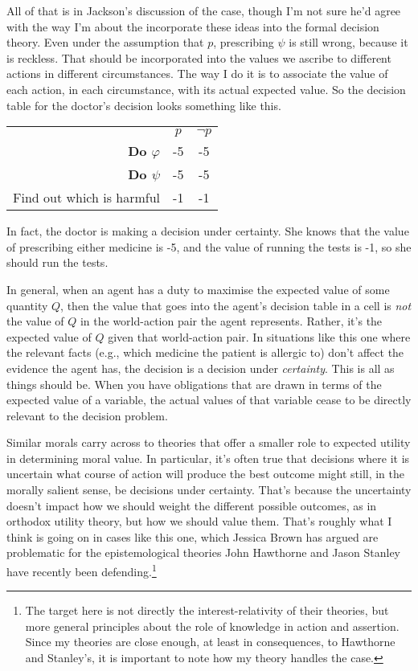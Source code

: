 \documentclass[11pt,oneside]{book}
\begin{document}
All of that is in Jackson's discussion of the case, though I'm not sure he'd agree with the way I'm about the incorporate these ideas into the formal decision theory. Even under the assumption that $p$, prescribing $\psi$ is still wrong, because it is reckless. That should be incorporated into the values we ascribe to different actions in different circumstances. The way I do it is to associate the value of each action, in each circumstance, with its actual expected value. So the decision table for the doctor's decision looks something like this.

\begin{center}
\begin{tabular}{r c c}
 & $p$ & $\neg p$ \\
\textbf{Do $\varphi$} & -5 & -5 \\
\textbf{Do $\psi$} & -5 & -5 \\
Find out which is harmful & -1 & -1 \\
\end{tabular}
\end{center}

\noindent In fact, the doctor is making a decision under certainty. She knows that the value of prescribing either medicine is -5, and the value of running the tests is -1, so she should run the tests.

In general, when an agent has a duty to maximise the expected value of some quantity $Q$, then the value that goes into the agent's decision table in a cell is \textit{not} the value of $Q$ in the world-action pair the agent represents. Rather, it's the expected value of $Q$ given that world-action pair. In situations like this one where the relevant facts (e.g., which medicine the patient is allergic to) don't affect the evidence the agent has, the decision is a decision under \textit{certainty}. This is all as things should be. When you have obligations that are drawn in terms of the expected value of a variable, the actual values of that variable cease to be directly relevant to the decision problem.

Similar morals carry across to theories that offer a smaller role to expected utility in determining moral value. In particular, it's often true that decisions where it is uncertain what course of action will produce the best outcome might still, in the morally salient sense, be decisions under certainty. That's because the uncertainty doesn't impact how we should weight the different possible outcomes, as in orthodox utility theory, but how we should value them. That's roughly what I think is going on in cases like this one, which Jessica Brown has argued are problematic for the epistemological theories John Hawthorne and Jason Stanley have recently been defending.\footnote{The target here is not directly the interest-relativity of their theories, but more general principles about the role of knowledge in action and assertion. Since my theories are close enough, at least in consequences, to Hawthorne and Stanley's, it is important to note how my theory handles the case.}
\end{document}
